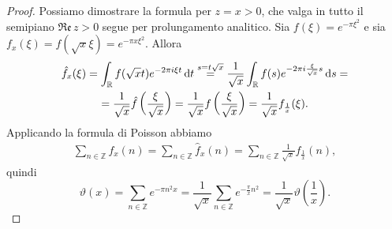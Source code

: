 \begin{proof}
  Possiamo dimostrare la formula per $z=x>0$, che valga in tutto il semipiano $\mathfrak{Re}\,z>0$ segue per prolungamento analitico. Sia $f(\xi)=e^{-\pi\xi^2}$ e sia $f_x(\xi)=f(\sqrt{x}\xi)=e^{-\pi x\xi^2}$. Allora
  \begin{gather*}
    \hat{f}_x(\xi)=\int_{\mathbb{R}} f(\sqrt{x}t)e^{-2\pi i\xi t}\mathop{}\!\mathrm{d} t \overset{s=t\sqrt{x}}{=} \frac{1}{\sqrt{x}}\int_{\mathbb{R}} f(s)e^{-2\pi i\frac{\xi}{\sqrt{x}}s}\mathop{}\!\mathrm{d} s= \\
    =\frac{1}{\sqrt{x}}\hat{f}\left(\frac{\xi}{\sqrt{x}}\right)=\frac{1}{\sqrt{x}}f\left(\frac{\xi}{\sqrt{x}}\right)=\frac{1}{\sqrt{x}}f_{\frac{1}{x}}(\xi).
  \end{gather*}
  Applicando la formula di Poisson abbiamo
  \begin{gather*}
    \sum_{n \in \mathbb{Z}} f_x(n)=\sum_{n \in \mathbb{Z}} \hat{f}_x(n)=\sum_{n \in \mathbb{Z}} \frac{1}{\sqrt{x}}f_{\frac{1}{x}}(n),
  \end{gather*}
  quindi
  $$\vartheta(x)=\sum_{n \in \mathbb{Z}} e^{-\pi n^2x}=\frac{1}{\sqrt{x}}\sum_{n \in \mathbb{Z}}e^{-\frac{\pi}{x}n^2}=\frac{1}{\sqrt{x}}\vartheta\left(\frac{1}{x}\right).$$
\end{proof}
